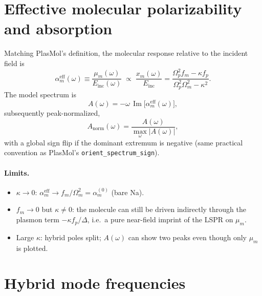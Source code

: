 \documentclass[11pt,a4paper]{article}
\begin{document}
\section{Effective molecular polarizability and absorption}

Matching PlasMol's definition, the molecular response relative to the
incident field is
\begin{equation}
  \alpha_m^{\mathrm{eff}}(\omega)
  \equiv
  \frac{\mu_m(\omega)}{E_{\mathrm{inc}}(\omega)}
  \;\propto\;
  \frac{x_m(\omega)}{E_{\mathrm{inc}}}
  =
  \frac{
    \Omega_p^2 f_m - \kappa f_p
  }{
    \Omega_p^2\Omega_m^2 - \kappa^2
  }.
  \label{eq:alpha-eff}
\end{equation}
The model spectrum is
\begin{equation}
  A(\omega)
  =
  -\omega\,
  \operatorname{Im}\!
  \big[
    \alpha_m^{\mathrm{eff}}(\omega)
  \big],
  \label{eq:A}
\end{equation}
subsequently peak-normalized,
\begin{equation}
  A_{\mathrm{norm}}(\omega)
  =
  \frac{A(\omega)}{\max_{\omega}|A(\omega)|},
\end{equation}
with a global sign flip if the dominant extremum is negative (same
practical convention as PlasMol's \texttt{orient\_spectrum\_sign}).

\paragraph{Limits.}
\begin{itemize}[leftmargin=1.4em]
  \item $\kappa\to 0$:
    $\alpha_m^{\mathrm{eff}}\to f_m/\Omega_m^2=\alpha_m^{(0)}$
    (bare Na).
  \item $f_m\to 0$ but $\kappa\neq 0$:
    the molecule can still be driven indirectly through the plasmon
    term $-\kappa f_p/\Delta$, i.e.\ a pure near-field imprint of the
    LSPR on $\mu_m$.
  \item Large $\kappa$: hybrid poles split; $A(\omega)$ can show two
    peaks even though only $\mu_m$ is plotted.
\end{itemize}

\section{Hybrid mode frequencies}
\end{document}

